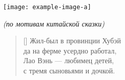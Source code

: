 \documentclass[a5paper,11pt]{memoir}
\begin{document}
\BgThispage
\hfill

\newpage

\texttt{[image: example-image-a]}

\newpage

\PlainPoemTitle
{}
\vspace{-4mm}
\begin{center}\small{\textit{(по мотивам китайской сказки)}}\end{center}

\begin{verse}[\versewidth]
Жил-был в провинции Хубэй \\
да на ферме усердно работал, \\
Лао Вэнь ---  любимец детей, \\
с тремя сыновьями и дочкой. \\
\end{verse}
\end{document}
